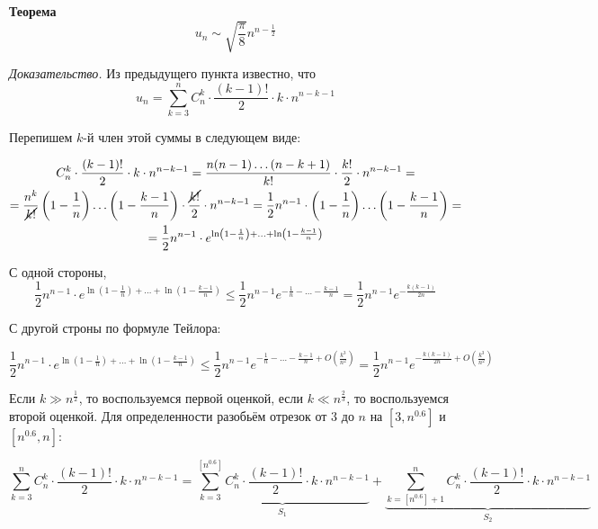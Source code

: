 \textbf{Теорема}
$$
    u_n \sim \sqrt{\frac{\pi}{8}} n^{n - \frac{1}{2}}
$$

\textit{Доказательство.}
Из предыдущего пункта известно, что
\begin{equation*}
    u_n = \sum_{k = 3}^{n} C_n^k \cdot
\frac{(k - 1)!}{2} \cdot k \cdot n^{n - k - 1}
\end{equation*}

Перепишем $k$-й член этой суммы в следующем виде:

\begin{multline*}
C_n^k \cdot \frac{(k - 1)!}{2} \cdot k \cdot n^{n - k - 1} = 
\frac{n(n - 1) \ldots (n - k + 1)}{k!} \cdot \frac{k!}{2} \cdot n^{n - k - 1} = \\
= \frac{n^k}{\cancel{k!}} \left( 1 - \frac{1}{n} \right) \ldots \left( 1 - \frac{k - 1}{n} \right) \cdot
\frac{\cancel{k!}}{2} \cdot n^{n - k - 1} = 
\frac{1}{2} n^{n - 1} \cdot \left( 1 - \frac{1}{n} \right) \ldots \left( 1 - \frac{k - 1}{n} \right) = \\
= \frac{1}{2} n^{n - 1} \cdot 
e^{\ln \left( 1 - \frac{1}{n} \right) + \ldots + \ln \left( 1 - \frac{k - 1}{n} \right)}
\end{multline*}

С одной стороны, 
$$
\frac{1}{2} n^{n - 1} \cdot e^{\ln \left( 1 - \frac{1}{n} \right) + \ldots + \ln \left( 1 - \frac{k - 1}{n} \right)}
\leqslant \frac{1}{2} n^{n - 1} e^{-\frac{1}{n} - \ldots - \frac{k - 1}{n}}
= \frac{1}{2} n^{n - 1} e^{-\frac{k(k - 1)}{2n}}
$$

С другой строны по формуле Тейлора:

$$
\frac{1}{2} n^{n - 1} \cdot e^{\ln \left( 1 - \frac{1}{n} \right) + \ldots + \ln \left( 1 - \frac{k - 1}{n} \right)}
\leqslant \frac{1}{2} n^{n - 1} 
e^{-\frac{1}{n} - \ldots - \frac{k - 1}{n} + O \left( \frac{k^3}{n^2} \right)}
= \frac{1}{2} n^{n - 1} e^{-\frac{k(k - 1)}{2n} + O \left( \frac{k^3}{n^2} \right)}
$$

Если $k \gg n^{\frac{1}{2}}$, то воспользуемся первой оценкой, 
если $k \ll n^{\frac{2}{3}}$, то воспользуемся второй оценкой. 
Для определенности разобьём отрезок от $3$ до $n$ на $[3, n^{0.6}]$ и $[n^{0.6}, n]$:

$$
\sum_{k = 3}^{n} C_n^k \cdot \frac{(k - 1)!}{2} \cdot k \cdot n^{n - k - 1} = 
\underbrace{\sum_{k = 3}^{[n^{0.6}]} C_n^k \cdot \frac{(k - 1)!}{2} \cdot k \cdot n^{n - k - 1}}_{S_1} + 
\underbrace{\sum_{k = [n^{0.6}] + 1}^{n} C_n^k \cdot \frac{(k - 1)!}{2} \cdot k \cdot n^{n - k - 1}}_{S_2}
$$

